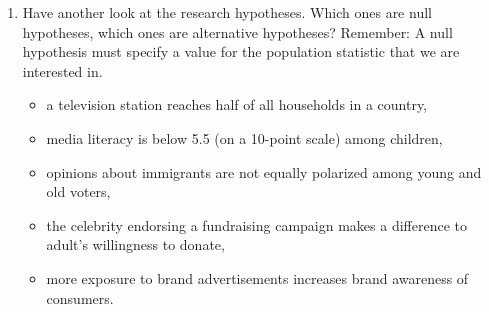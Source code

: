 \documentclass[a4paper]{book}
\theoremstyle{definition}
\theoremstyle{definition}
\theoremstyle{definition}
\theoremstyle{remark}
\begin{document}
\begin{enumerate}
\def\labelenumi{\arabic{enumi}.}
\item
  Have another look at the research hypotheses. Which ones are null
  hypotheses, which ones are alternative hypotheses? Remember: A null
  hypothesis must specify a value for the population statistic that we
  are interested in.

  \begin{itemize}
  \item
    a television station reaches half of all households in a country,
  \item
    media literacy is below 5.5 (on a 10-point scale) among children,
  \item
    opinions about immigrants are not equally polarized among young and
    old voters,
  \item
    the celebrity endorsing a fundraising campaign makes a difference to
    adult's willingness to donate,
  \item
    more exposure to brand advertisements increases brand awareness of
    consumers.
  \end{itemize}
\end{enumerate}
\end{document}
